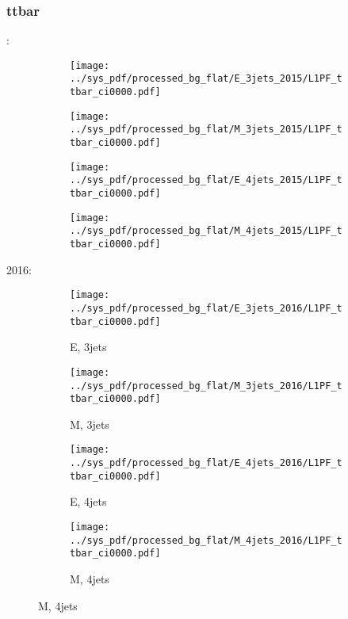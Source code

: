 \documentclass{beamer}
\begin{document}
\begin{frame}
\frametitle{ttbar}
\fontsize{5}{1}:
\begin{figure}
\centering
\begin{subfigure}[b]{0.24\textwidth}
\texttt{[image: ../sys\_pdf/processed\_bg\_flat/E\_3jets\_2015/L1PF\_ttbar\_ci0000.pdf]}
\end{subfigure}
\begin{subfigure}[b]{0.24\textwidth}
\texttt{[image: ../sys\_pdf/processed\_bg\_flat/M\_3jets\_2015/L1PF\_ttbar\_ci0000.pdf]}
\end{subfigure}
\begin{subfigure}[b]{0.24\textwidth}
\texttt{[image: ../sys\_pdf/processed\_bg\_flat/E\_4jets\_2015/L1PF\_ttbar\_ci0000.pdf]}
\end{subfigure}
\begin{subfigure}[b]{0.24\textwidth}
\texttt{[image: ../sys\_pdf/processed\_bg\_flat/M\_4jets\_2015/L1PF\_ttbar\_ci0000.pdf]}
\end{subfigure}
\end{figure}
2016:
\begin{figure}
\centering
\begin{subfigure}[b]{0.24\textwidth}
\texttt{[image: ../sys\_pdf/processed\_bg\_flat/E\_3jets\_2016/L1PF\_ttbar\_ci0000.pdf]}
\captionsetup{font=tiny}
\caption{E, 3jets}
\end{subfigure}
\begin{subfigure}[b]{0.24\textwidth}
\texttt{[image: ../sys\_pdf/processed\_bg\_flat/M\_3jets\_2016/L1PF\_ttbar\_ci0000.pdf]}
\captionsetup{font=tiny}
\caption{M, 3jets}
\end{subfigure}
\begin{subfigure}[b]{0.24\textwidth}
\texttt{[image: ../sys\_pdf/processed\_bg\_flat/E\_4jets\_2016/L1PF\_ttbar\_ci0000.pdf]}
\captionsetup{font=tiny}
\caption{E, 4jets}
\end{subfigure}
\begin{subfigure}[b]{0.24\textwidth}
\texttt{[image: ../sys\_pdf/processed\_bg\_flat/M\_4jets\_2016/L1PF\_ttbar\_ci0000.pdf]}
\captionsetup{font=tiny}
\caption{M, 4jets}
\end{subfigure}
\end{figure}
\end{frame}
\end{document}
